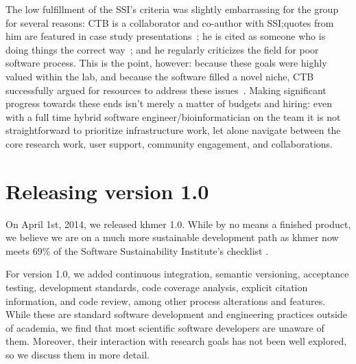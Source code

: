 \documentclass[12pt]{article}
\begin{document}

The low fulfillment of the SSI's criteria was slightly embarrassing for
the group for several reasons: CTB is a collaborator and co-author
with SSI;\@ quotes from him are featured in case study
presentations~\cite{SSI-casestudies}; he is cited as someone who is doing things
the correct way~\cite{SSI-recomputation}; and he regularly criticizes the
field for poor software process.  This is the point, however: because
these goals were highly valued within the lab, and because the
software filled a novel niche, CTB successfully argued for resources
to address these issues~\cite{khmer-future}.  Making significant
progress towards these ends isn't merely a matter of budgets and
hiring: even with a full time hybrid software
engineer/bioinformatician on the team it is not straightforward to
prioritize infrastructure work, let alone navigate between the core
research work, user support, community engagement, and collaborations.



\section{Releasing version 1.0}


On April 1st, 2014, we released khmer 1.0.  While by no means a finished
product, we believe we are on a much more sustainable development path as khmer
now meets 69\% of the Software Sustainability Institute's checklist
\cite{khmer-1.0-assessment}.

For version 1.0, we added continuous integration, semantic versioning,
acceptance testing, development standards, code coverage analysis,
explicit citation information, and code review, among other process
alterations and features.  While these are standard software
development and engineering practices outside of academia, we find
that most scientific software developers are unaware of them.
Moreover, their interaction with research goals has not been well
explored, so we discuss them in more detail.
\end{document}
